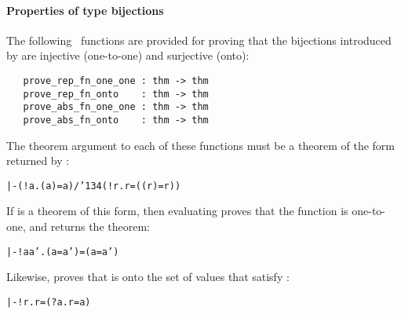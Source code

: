 \paragraph{Properties of type bijections}


The following \ML\ functions are provided for proving that the bijections
introduced by  are injective (one-to-one)
and surjective (onto):

\begin{holboxed}
\begin{verbatim}
   prove_rep_fn_one_one : thm -> thm
   prove_rep_fn_onto    : thm -> thm
   prove_abs_fn_one_one : thm -> thm
   prove_abs_fn_onto    : thm -> thm
\end{verbatim}\end{holboxed}

\noindent The theorem argument to each of these functions must be a theorem
of the form returned by :

{\def\bk{\char'134}
\begin{hol}\begin{alltt}
   |- (!a. ( a) = a) /\bk (!r.  r = (( r) = r))
\end{alltt}\end{hol}}

\noindent If  is a theorem of this form, then evaluating
 proves that the function  is
one-to-one, and returns the theorem:

\begin{hol}\begin{alltt}
   |- !a a'. ( a =  a') = (a = a')
\end{alltt}\end{hol}

\noindent Likewise,  proves that  is
onto the set of values that satisfy :

{\def\bk{\char'134}
\begin{hol}\begin{alltt}
   |- !r.  r = (?a. r =  a)
\end{alltt}\end{hol}}

